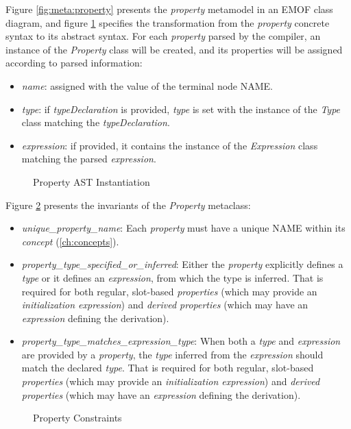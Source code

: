 \begin{abstract-syntax}
Figure \ref{fig:meta:property} presents the \emph{property} metamodel
in an EMOF \cite{mof} class diagram,
and figure \ref{fig:ast:property} specifies
the transformation
from the \emph{property} concrete syntax to its abstract syntax.
For each \emph{property} parsed by the compiler,
an instance of the \emph{Property} class will be created,
and its properties will be assigned
according to parsed information:

\begin{itemize}

\item \emph{name}:
assigned with the value of the terminal node NAME.

\item \emph{type}:
if \emph{typeDeclaration} is provided,
\emph{type} is set with the instance of the \emph{Type} class
matching the \emph{typeDeclaration}.

\item \emph{expression}:
if provided,
it contains the instance of the \emph{Expression} class
matching the parsed \emph{expression}.

\end{itemize}
\end{abstract-syntax}

\begin{figure}
\verbatimfont{\small}

\caption{Property AST Instantiation}
\label{fig:ast:property}
\end{figure}

\begin{constraints}
Figure \ref{fig:ocl:property} presents the invariants
of the \emph{Property} metaclass:

\begin{itemize}

\item \emph{unique\_property\_name}:
Each \emph{property} must have a unique NAME within its \emph{concept}
(\ref{ch:concepts}).

\item \emph{property\_type\_specified\_or\_inferred}:
Either the \emph{property} explicitly defines a \emph{type}
or it defines an \emph{expression},
from which the type is inferred.
That is required for both regular, slot-based \emph{properties}
(which may provide an \emph{initialization expression})
and \emph{derived properties}
(which may have an \emph{expression} defining the derivation).

\item \emph{property\_type\_matches\_expression\_type}:
When both a \emph{type} and \emph{expression} are provided by a \emph{property},
the \emph{type} inferred from the \emph{expression} should match
the declared \emph{type}.
That is required for both regular, slot-based \emph{properties}
(which may provide an \emph{initialization expression})
and \emph{derived properties}
(which may have an \emph{expression} defining the derivation).

\end{itemize}
\end{constraints}

\begin{figure}

\caption{Property Constraints}
\label{fig:ocl:property}
\end{figure}
